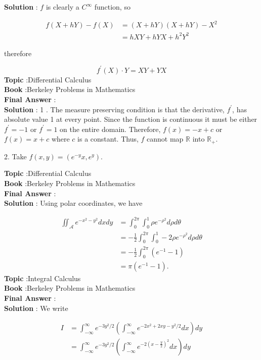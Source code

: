 \documentclass[10pt]{article}
\begin{document}
\textbf{Solution} : $f$ is clearly a $C^{\infty}$ function, so

$$
\begin{aligned}
f(X+h Y)-f(X) &=(X+h Y)(X+h Y)-X^{2} \\
&=h X Y+h Y X+h^{2} Y^{2}
\end{aligned}
$$

therefore

$$
f^{\prime}(X) \cdot Y=X Y+Y X
$$
\textbf{Topic} :Differential Calculus \\
\textbf{Book} :Berkeley Problems in Mathematics\\
\textbf{Final Answer} :\\


\textbf{Solution} : 1 . The measure preserving condition is that the derivative, $f^{\prime}$, has absolute value 1 at every point. Since the function is continuous it must be either $f^{\prime}=-1$ or $f^{\prime}=1$ on the entire domain. Therefore, $f(x)=-x+c$ or $f(x)=x+c$ where $c$ is a constant. Thus, $f$ cannot map $\mathbb{R}$ into $\mathbb{R}_{+}$.

2. Take $f(x, y)=\left(e^{-y} x, e^{y}\right)$.


\textbf{Topic} :Differential Calculus \\
\textbf{Book} :Berkeley Problems in Mathematics\\
\textbf{Final Answer} :\\


\textbf{Solution} : Using polar coordinates, we have

$$
\begin{aligned}
\iint_{\mathcal{A}} e^{-x^{2}-y^{2}} d x d y &=\int_{0}^{2 \pi} \int_{0}^{1} \rho e^{-\rho^{2}} d \rho d \theta \\
&=-\frac{1}{2} \int_{0}^{2 \pi} \int_{0}^{1}-2 \rho e^{-\rho^{2}} d \rho d \theta \\
&=-\frac{1}{2} \int_{0}^{2 \pi}\left(e^{-1}-1\right) \\
&=\pi\left(e^{-1}-1\right) .
\end{aligned}
$$
\textbf{Topic} :Integral Calculus \\
\textbf{Book} :Berkeley Problems in Mathematics\\
\textbf{Final Answer} :\\


\textbf{Solution} : We write

$$
\begin{aligned}
I &=\int_{-\infty}^{\infty} e^{-3 y^{2} / 2}\left(\int_{-\infty}^{\infty} e^{-2 x^{2}+2 x y-y^{2} / 2} d x\right) d y \\
&=\int_{-\infty}^{\infty} e^{-3 y^{2} / 2}\left(\int_{-\infty}^{\infty} e^{-2\left(x-\frac{y}{2}\right)^{2}} d x\right) d y
\end{aligned}
$$
\end{document}

